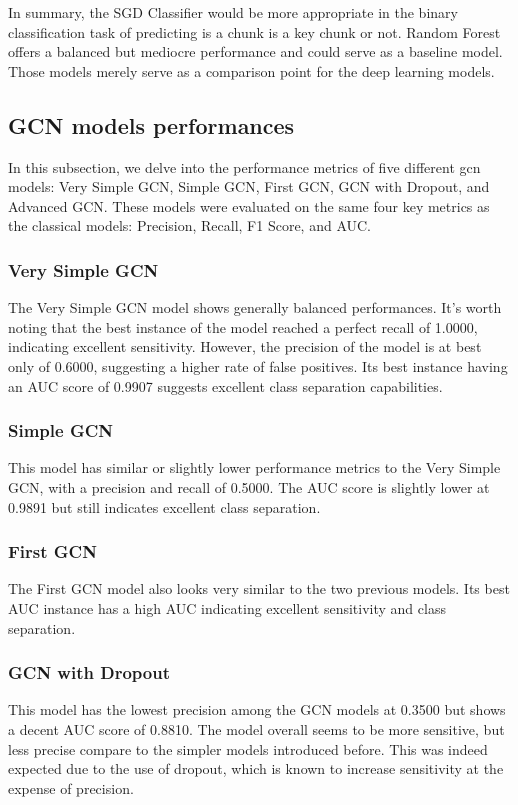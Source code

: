In summary, the SGD Classifier would be more appropriate in the binary classification task of predicting is a chunk is a key chunk or not. Random Forest offers a balanced but mediocre performance and could serve as a baseline model. Those models merely serve as a comparison point for the deep learning models.

\subsection{GCN models performances}

In this subsection, we delve into the performance metrics of five different \acrfull{gcn} models: Very Simple GCN, Simple GCN, First GCN, GCN with Dropout, and Advanced GCN. These models were evaluated on the same four key metrics as the classical models: Precision, Recall, F1 Score, and AUC.

\subsubsection{Very Simple GCN}
The Very Simple GCN model shows generally balanced performances. It's worth noting that the best instance of the model reached a perfect recall of 1.0000, indicating excellent sensitivity. However, the precision of the model is at best only of 0.6000, suggesting a higher rate of false positives. Its best instance having an AUC score of 0.9907 suggests excellent class separation capabilities.

\subsubsection{Simple GCN}
This model has similar or slightly lower performance metrics to the Very Simple GCN, with a precision and recall of 0.5000. The AUC score is slightly lower at 0.9891 but still indicates excellent class separation.

\subsubsection{First GCN}
The First GCN model also looks very similar to the two previous models. Its best AUC instance has a high AUC indicating excellent sensitivity and class separation. 

\subsubsection{GCN with Dropout}
This model has the lowest precision among the GCN models at 0.3500 but shows a decent AUC score of 0.8810. The model overall seems to be more sensitive, but less precise compare to the simpler models introduced before. This was indeed expected due to the use of dropout, which is known to increase sensitivity at the expense of precision.

